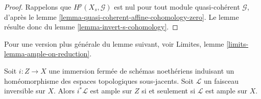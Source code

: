 \begin{proof}
Rappelons que $H^p(X_s, \mathcal{G})$ est nul pour tout module
quasi-cohérent $\mathcal{G}$, d'après
le lemme \ref{lemma-quasi-coherent-affine-cohomology-zero}.
Le lemme résulte donc du
lemme \ref{lemma-invert-s-cohomology}.
\end{proof}

\noindent
Pour une version plus générale du lemme suivant, voir
Limites, lemme \ref{limits-lemma-ample-on-reduction}.

\begin{lemma}
\label{lemma-ample-on-reduction}
Soit $i : Z \to X$ une immersion fermée de schémas noethériens induisant
un homéomorphisme des espaces topologiques sous-jacents.
Soit $\mathcal{L}$ un faisceau inversible sur $X$.
Alors $i^*\mathcal{L}$ est ample sur $Z$ si et seulement si
$\mathcal{L}$ est ample sur $X$.
\end{lemma}

